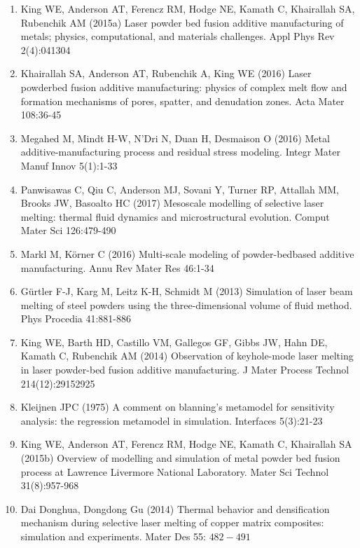 \documentclass[10pt]{article}
\begin{document}
\begin{enumerate}
  \item King WE, Anderson AT, Ferencz RM, Hodge NE, Kamath C, Khairallah SA, Rubenchik AM (2015a) Laser powder bed fusion additive manufacturing of metals; physics, computational, and materials challenges. Appl Phys Rev 2(4):041304

  \item Khairallah SA, Anderson AT, Rubenchik A, King WE (2016) Laser powderbed fusion additive manufacturing: physics of complex melt flow and formation mechanisms of pores, spatter, and denudation zones. Acta Mater 108:36-45

  \item Megahed M, Mindt H-W, N’Dri N, Duan H, Desmaison O (2016) Metal additive-manufacturing process and residual stress modeling. Integr Mater Manuf Innov 5(1):1-33

  \item Panwisawas C, Qiu C, Anderson MJ, Sovani Y, Turner RP, Attallah MM, Brooks JW, Basoalto HC (2017) Mesoscale modelling of selective laser melting: thermal fluid dynamics and microstructural evolution. Comput Mater Sci 126:479-490

  \item Markl M, Körner C (2016) Multi-scale modeling of powder-bedbased additive manufacturing. Annu Rev Mater Res 46:1-34

  \item Gürtler F-J, Karg M, Leitz K-H, Schmidt M (2013) Simulation of laser beam melting of steel powders using the three-dimensional volume of fluid method. Phys Procedia 41:881-886

  \item King WE, Barth HD, Castillo VM, Gallegos GF, Gibbs JW, Hahn DE, Kamath C, Rubenchik AM (2014) Observation of keyhole-mode laser melting in laser powder-bed fusion additive manufacturing. J Mater Process Technol 214(12):29152925

  \item Kleijnen JPC (1975) A comment on blanning's metamodel for sensitivity analysis: the regression metamodel in simulation. Interfaces 5(3):21-23

  \item King WE, Anderson AT, Ferencz RM, Hodge NE, Kamath C, Khairallah SA (2015b) Overview of modelling and simulation of metal powder bed fusion process at Lawrence Livermore National Laboratory. Mater Sci Technol 31(8):957-968

  \item Dai Donghua, Dongdong Gu (2014) Thermal behavior and densification mechanism during selective laser melting of copper matrix composites: simulation and experiments. Mater Des 55: $482-491$


\end{enumerate}
\end{document}
